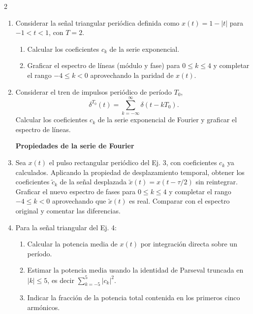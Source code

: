 \documentclass[10pt,a4paper]{article}
\begin{document}
\begin{multicols}{2}
\begin{enumerate}
			\item Considerar la señal triangular periódica definida como $x(t) = 1 - |t|$ para $-1 < t < 1$, con $T = 2$.
			\begin{enumerate}
				\item Calcular los coeficientes $c_k$ de la serie exponencial.
				\item Graficar el espectro de líneas (módulo y fase) para $0 \leq k \leq 4$ y completar el rango $-4 \leq k < 0$ aprovechando la paridad de $x(t)$.
			\end{enumerate}

			\item Considerar el tren de impulsos periódico de período $T_0$,
			\[
				\delta^{T_0}(t) = \sum_{k=-\infty}^{\infty} \delta(t - kT_0).
			\]
			Calcular los coeficientes $c_k$ de la serie exponencial de Fourier y graficar el espectro de líneas.

			\textbf{Propiedades de la serie de Fourier}
			\item Sea $x(t)$ el pulso rectangular periódico del Ej. 3, con coeficientes $c_k$ ya calculados. Aplicando la propiedad de desplazamiento temporal, obtener los coeficientes $\tilde{c}_k$ de la señal desplazada $\tilde{x}(t) = x(t - \tau/2)$ sin reintegrar. Graficar el nuevo espectro de fases para $0 \leq k \leq 4$ y completar el rango $-4 \leq k < 0$ aprovechando que $\tilde{x}(t)$ es real. Comparar con el espectro original y comentar las diferencias.

			\item Para la señal triangular del Ej. 4:
			\begin{enumerate}
				\item Calcular la potencia media de $x(t)$ por integración directa sobre un período.
				\item Estimar la potencia media usando la identidad de Parseval truncada en $|k| \leq 5$, es decir $\sum_{k=-5}^{5} |c_k|^2$.
				\item Indicar la fracción de la potencia total contenida en los primeros cinco armónicos.
			\end{enumerate}


\end{enumerate}
\end{multicols}
\end{document}
